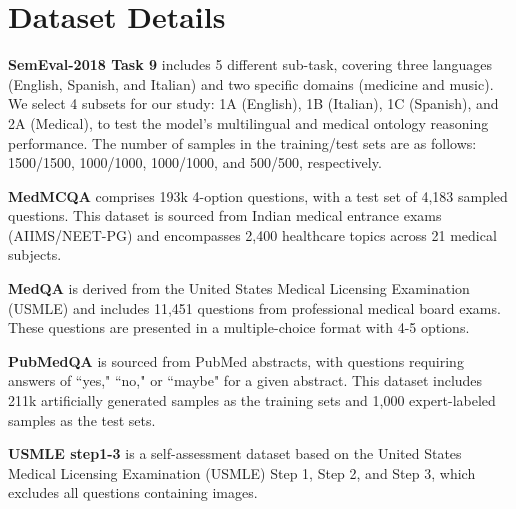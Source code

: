 \section{Dataset Details}\label{app:a}
\begin{list}{\huge\textbullet}{\leftmargin=1.5em}
    \item \textbf{SemEval-2018 Task 9}  \cite{DBLP:conf/semeval/Camacho-Collados18} includes 5 different sub-task, covering three languages (English, Spanish, and Italian) and two specific domains (medicine and music). We select 4 subsets for our study: 1A (English), 1B (Italian), 1C (Spanish), and 2A (Medical), to test the model's multilingual and medical ontology reasoning performance. The number of samples in the training/test sets are as follows: 1500/1500, 1000/1000, 1000/1000, and 500/500, respectively.
    \item \textbf{MedMCQA} \cite{DBLP:conf/chil/PalUS22} comprises 193k 4-option questions, with a test set of 4,183 sampled questions. This dataset is sourced from Indian medical entrance exams (AIIMS/NEET-PG) and encompasses 2,400 healthcare topics across 21 medical subjects. 
    \item \textbf{MedQA} \cite{DBLP:journals/corr/abs-2009-13081} is derived from the United States Medical Licensing Examination (USMLE) and includes 11,451 questions from professional medical board exams. These questions are presented in a multiple-choice format with 4-5 options. 
    \item \textbf{PubMedQA} \cite{DBLP:conf/emnlp/JinDLCL19} is sourced from PubMed abstracts, with questions requiring answers of ``yes," ``no," or ``maybe" for a given abstract. This dataset includes 211k artificially generated samples as the training sets and 1,000 expert-labeled samples as the test sets. 
    \item \textbf{USMLE step1-3} \cite{DBLP:journals/corr/abs-2304-08247} is a self-assessment dataset based on the United States Medical Licensing Examination (USMLE) Step 1, Step 2, and Step 3, which excludes all questions containing images.

\end{list}


